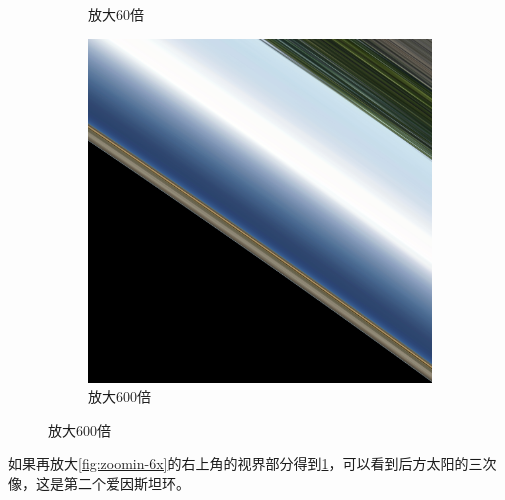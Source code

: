 \begin{figure}[H]
\begin{subfigure}{.33\textwidth}
        \caption{放大60倍}
        \label{fig:zoomin-60x} %
    \end{subfigure}
    \begin{subfigure}{.33\textwidth}
        \centering
        \includegraphics[width=.95\linewidth]{images/zoomin_600x.png}
        \caption{放大600倍}
        \label{fig:zoomin-600x}
    \end{subfigure}%
\end{figure}


如果再放大\ref{fig:zoomin-6x}的右上角的视界部分得到\ref{fig:zoomin-60x}，可以看到后方太阳的三次像，这是第二个爱因斯坦环。

